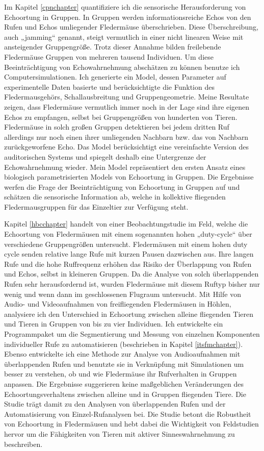 \documentclass[
]{book}
\begin{document}
Im Kapitel \ref{cpnchapter} quantifiziere ich die sensorische Herausforderung von Echoortung in Gruppen. In Gruppen werden informationsreiche Echos von den Rufen und Echos umliegender Fledermäuse überschrieben. Diese Überschreibung, auch „jamming`` genannt, steigt vermutlich in einer nicht linearen Weise mit ansteigender Gruppengröße. Trotz dieser Annahme bilden freilebende Fledermäuse Gruppen von mehreren tausend Individuen. Um diese Beeinträchtigung von Echowahrnehmung abschätzen zu können benutze ich Computersimulationen. Ich generierte ein Model, dessen Parameter auf experimentelle Daten basierte und berücksichtigte die Funktion des Fledermausgehörs, Schallausbreitung und Gruppengeometrie. Meine Resultate zeigen, dass Fledermäuse vermutlich immer noch in der Lage sind ihre eigenen Echos zu empfangen, selbst bei Gruppengrößen von hunderten von Tieren. Fledermäuse in solch großen Gruppen detektieren bei jedem dritten Ruf allerdings nur noch einen ihrer umliegenden Nachbarn bzw. das von Nachbarn zurückgeworfene Echo. Das Model berücksichtigt eine vereinfachte Version des auditorischen Systems und spiegelt deshalb eine Untergrenze der Echowahrnehmung wieder. Mein Model repräsentiert den ersten Ansatz eines biologisch parametrisierten Models von Echoortung in Gruppen. Die Ergebnisse werfen die Frage der Beeinträchtigung von Echoortung in Gruppen auf und schätzen die sensorische Information ab, welche in kollektive fliegenden Fledermausgruppen für das Einzeltier zur Verfügung steht.

Kapitel \ref{hbcchapter} handelt von einer Beobachtungstudie im Feld, welche die Echoortung von Fledermäusen mit einem sogenannten hohen „duty-cycle`` über verschiedene Gruppengrößen untersucht. Fledermäusen mit einem hohen duty cycle senden relative lange Rufe mit kurzen Pausen dazwischen aus. Ihre langen Rufe und die hohe Ruffrequenz erhöhen das Risiko der Überlappung von Rufen und Echos, selbst in kleineren Gruppen. Da die Analyse von solch überlappenden Rufen sehr herausfordernd ist, wurden Fledermäuse mit diesem Ruftyp bisher nur wenig und wenn dann im geschlossenen Flugraum untersucht. Mit Hilfe von Audio- und Videoaufnahmen von freifliegenden Fledermäusen in Höhlen, analysiere ich den Unterschied in Echoortung zwischen alleine fliegenden Tieren und Tieren in Gruppen von bis zu vier Individuen. Ich entwickelte ein Programmpaket um die Segmentierung und Messung von einzelnen Komponenten individueller Rufe zu automatisieren (beschrieben in Kapitel \ref{itsfmchapter}). Ebenso entwickelte ich eine Methode zur Analyse von Audioaufnahmen mit überlappenden Rufen und benutzte sie in Verknüpfung mit Simulationen um besser zu verstehen, ob und wie Fledermäuse ihr Rufverhalten in Gruppen anpassen. Die Ergebnisse suggerieren keine maßgeblichen Veränderungen des Echoortungsverhaltens zwischen alleine und in Gruppen fliegenden Tiere. Die Studie trägt damit zu den Analysen von überlappenden Rufen und der Automatisierung von Einzel-Rufanalysen bei. Die Studie betont die Robustheit von Echoortung in Fledermäusen und hebt dabei die Wichtigkeit von Feldstudien hervor um die Fähigkeiten von Tieren mit aktiver Sinneswahrnehmung zu beschreiben.
\end{document}
